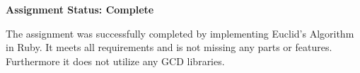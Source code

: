 \documentclass[11pt]{memo}
\begin{document}
\USM

\Date{\today}

\begin{memo}

\textbf{Assignment Status: Complete}

The assignment was successfully completed by implementing Euclid's Algorithm in Ruby.  It meets all requirements and is not missing any parts or features.  Furthermore it does not utilize any GCD libraries.

\end{memo}
\end{document}
